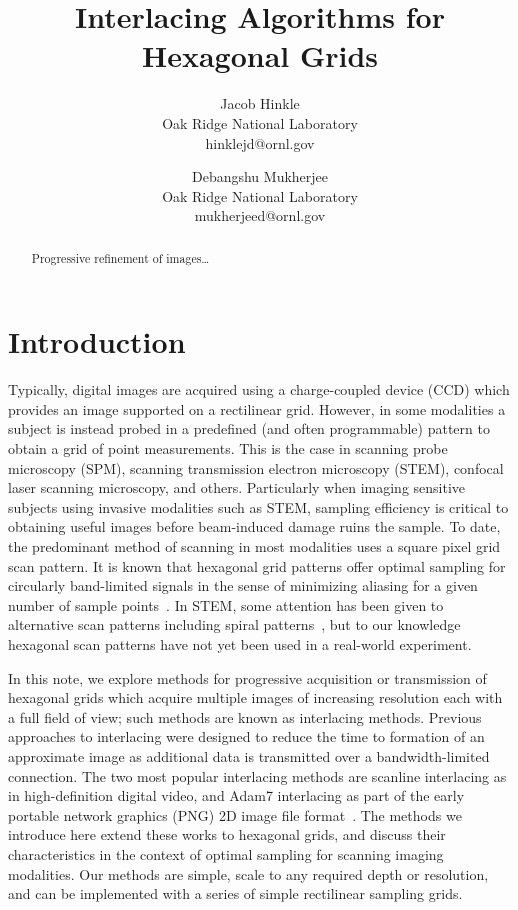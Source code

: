 \documentclass{article}
\title{Interlacing Algorithms for Hexagonal Grids}
\author{Jacob Hinkle\\
Oak Ridge National Laboratory\\
hinklejd@ornl.gov \and Debangshu Mukherjee\\
Oak Ridge National Laboratory\\
mukherjeed@ornl.gov}
\date{}
\begin{document}
\maketitle
\begin{abstract}
Progressive refinement of images\ldots{}
\end{abstract}

\section{Introduction}
\label{sec:intro}

Typically, digital images are acquired using a charge-coupled device (CCD) which provides an image supported on a rectilinear grid.
%
However, in some modalities a subject is instead probed in a predefined (and often programmable) pattern to obtain a grid of point measurements.
%
This is the case in scanning probe microscopy (SPM), scanning transmission electron microscopy (STEM), confocal laser scanning microscopy, and others.
%
Particularly when imaging sensitive subjects using invasive modalities such as STEM, sampling efficiency is critical to obtaining useful images before beam-induced damage ruins the sample.
%
To date, the predominant method of scanning in most modalities uses a square pixel grid scan pattern.
%
It is known that hexagonal grid patterns offer optimal sampling for circularly band-limited signals in the sense of minimizing aliasing for a given number of sample points~\citep{petersen1962}.
%
In STEM, some attention has been given to alternative scan patterns including spiral patterns~\citep{sang2016dynamic}, but to our knowledge hexagonal scan patterns have not yet been used in a real-world experiment.


In this note, we explore methods for progressive acquisition or transmission of hexagonal grids which acquire multiple images of increasing resolution each with a full field of view; such methods are known as interlacing methods.
%
Previous approaches to interlacing were designed to reduce the time to formation of an approximate image as additional data is transmitted over a bandwidth-limited connection.
%
The two most popular interlacing methods are scanline interlacing as in high-definition digital video, and Adam7 interlacing as part of the early portable network graphics (PNG) 2D image file format~\citep{rfc2083}.
%
The methods we introduce here extend these works to hexagonal grids, and discuss their characteristics in the context of optimal sampling for scanning imaging modalities.
%
Our methods are simple, scale to any required depth or resolution, and can be
implemented with a series of simple rectilinear sampling grids.
\end{document}
